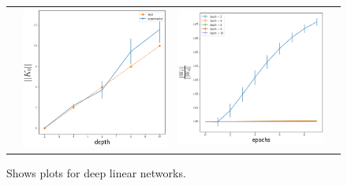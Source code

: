 \begin{figure}[h]
{\begin{tabular}{cccc}
&
\includegraphics[scale=0.4]{figs/dln-k-vs-d.png}
&
\includegraphics[scale=0.4]{figs/dln-norm.png}
\end{tabular}
}
\caption{Shows plots for deep linear networks.}
\label{fig:dlnplots}

\end{figure}


